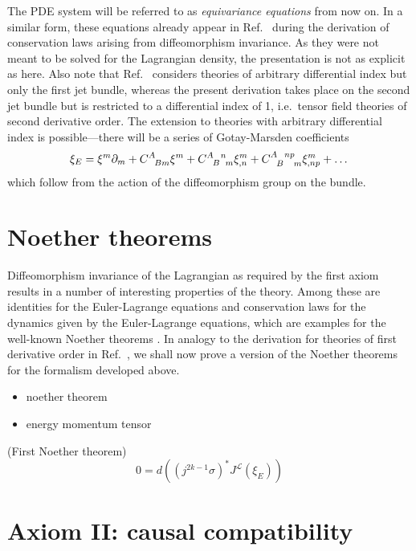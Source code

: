 The PDE system will be referred to as \emph{equivariance equations} from now on. In a similar form, these equations already appear in Ref.~\cite{goma} during the derivation of conservation laws arising from diffeomorphism invariance. As they were not meant to be solved for the Lagrangian density, the presentation is not as explicit as here. Also note that Ref.~\cite{goma} considers theories of arbitrary differential index but only the first jet bundle, whereas the present derivation takes place on the second jet bundle but is restricted to a differential index of 1, i.e.~tensor field theories of second derivative order. The extension to theories with arbitrary differential index is possible---there will be a series of Gotay-Marsden coefficients
\begin{equation}
  \xi_E = \xi^m\partial_m + C^A_{\hphantom ABm} \xi^m + C^{A\hphantom Bn}_{\hphantom AB\hphantom nm} \xi^m_{,n} + C^{A\hphantom Bnp}_{\hphantom AB\hphantom {np}m} \xi^m_{,np} + \dots
\end{equation}
which follow from the action of the diffeomorphism group on the bundle. \cite{goma}

\section{Noether theorems}
Diffeomorphism invariance of the Lagrangian as required by the first axiom results in a number of interesting properties of the theory. Among these are identities for the Euler-Lagrange equations and conservation laws for the dynamics given by the Euler-Lagrange equations, which are examples for the well-known Noether theorems \cite{}. In analogy to the derivation for theories of first derivative order in Ref.~\cite{goma}, we shall now prove a version of the Noether theorems for the formalism developed above.

\begin{itemize}
\item noether theorem
\item energy momentum tensor
\end{itemize}

\begin{proposition}{(First Noether theorem)}
  \begin{equation}
    0 = d \left((j^{2k-1}\sigma)^\ast J^\mathcal L(\xi_E)\right)
  \end{equation}
\end{proposition}

\section{Axiom II: causal compatibility}

